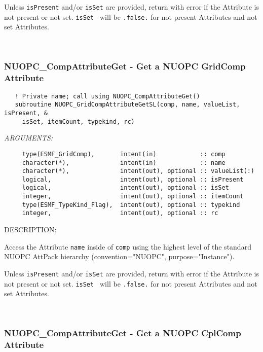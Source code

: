      Unless {\tt isPresent} and/or {\tt isSet} are provided, return with error
     if the Attribute is not present or not set. {\tt isSet } will be 
     {\tt .false.} for not present Attributes and not set Attributes. 
 
\mbox{}\hrulefill\ 
 
\subsubsection [NUOPC\_CompAttributeGet] {NUOPC\_CompAttributeGet - Get a NUOPC GridComp Attribute}


\begin{verbatim}   ! Private name; call using NUOPC_CompAttributeGet() 
   subroutine NUOPC_GridCompAttributeGetSL(comp, name, valueList, isPresent, &
     isSet, itemCount, typekind, rc)\end{verbatim}{\em ARGUMENTS:}
\begin{verbatim}     type(ESMF_GridComp),       intent(in)            :: comp
     character(*),              intent(in)            :: name
     character(*),              intent(out), optional :: valueList(:)
     logical,                   intent(out), optional :: isPresent
     logical,                   intent(out), optional :: isSet
     integer,                   intent(out), optional :: itemCount
     type(ESMF_TypeKind_Flag),  intent(out), optional :: typekind
     integer,                   intent(out), optional :: rc\end{verbatim}
{\sf DESCRIPTION:\\ }


     Access the Attribute {\tt name} inside of {\tt comp} using the highest level
     of the standard NUOPC AttPack hierarchy (convention="NUOPC", 
     purpose="Instance").
  
     Unless {\tt isPresent} and/or {\tt isSet} are provided, return with error
     if the Attribute is not present or not set. {\tt isSet } will be 
     {\tt .false.} for not present Attributes and not set Attributes. 
 
\mbox{}\hrulefill\ 
 
\subsubsection [NUOPC\_CompAttributeGet] {NUOPC\_CompAttributeGet - Get a NUOPC CplComp Attribute}


